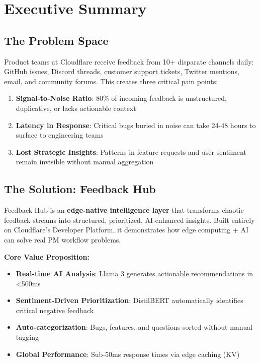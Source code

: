 \documentclass[11pt,a4paper]{article}
\begin{document}
\tableofcontents
\newpage

\section{Executive Summary}

\subsection{The Problem Space}

Product teams at Cloudflare receive feedback from 10+ disparate channels daily: GitHub issues, Discord threads, customer support tickets, Twitter mentions, email, and community forums. This creates three critical pain points:

\begin{enumerate}[leftmargin=*, itemsep=0.5em]
    \item \textbf{Signal-to-Noise Ratio}: 80\% of incoming feedback is unstructured, duplicative, or lacks actionable context
    \item \textbf{Latency in Response}: Critical bugs buried in noise can take 24-48 hours to surface to engineering teams
    \item \textbf{Lost Strategic Insights}: Patterns in feature requests and user sentiment remain invisible without manual aggregation
\end{enumerate}

\subsection{The Solution: Feedback Hub}

Feedback Hub is an \textbf{edge-native intelligence layer} that transforms chaotic feedback streams into structured, prioritized, AI-enhanced insights. Built entirely on Cloudflare's Developer Platform, it demonstrates how edge computing + AI can solve real PM workflow problems.

\begin{infobox}
\textbf{Core Value Proposition:}
\begin{itemize}[leftmargin=*, itemsep=0.3em]
    \item \faRocket \textbf{Real-time AI Analysis}: Llama 3 generates actionable recommendations in <500ms
    \item \faBrain \textbf{Sentiment-Driven Prioritization}: DistilBERT automatically identifies critical negative feedback
    \item \faLayerGroup \textbf{Auto-categorization}: Bugs, features, and questions sorted without manual tagging
    \item \faGlobe \textbf{Global Performance}: Sub-50ms response times via edge caching (KV)
\end{itemize}
\end{infobox}
\end{document}

